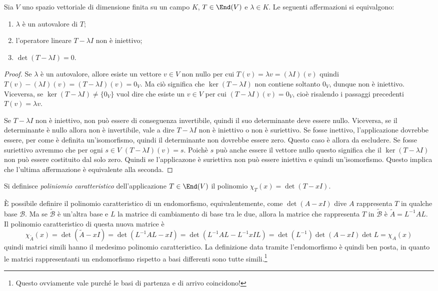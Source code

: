 \begin{teorema}\label{t:autovalore-determinante}
	Sia $V$ uno spazio vettoriale di dimensione finita su un campo $K$, $T\in\End(V)$ e $\lambda\in K$. Le seguenti affermazioni si equivalgono:
	\begin{enumerate}
		\item $\lambda$ è un autovalore di $T$;
		\item l'operatore lineare $T-\lambda I$ non è iniettivo;
		\item $\det(T-\lambda I)=0$.
	\end{enumerate}
\end{teorema}
\begin{proof}
	Se $\lambda$ è un autovalore, allore esiste un vettore $v\in V$ non nullo per cui $T(v)=\lambda v=(\lambda I)(v)$ quindi $T(v)-(\lambda I)(v)=(T-\lambda I)(v)=0_V$.
	Ma ciò significa che $\ker(T-\lambda I)$ non contiene soltanto $0_V$, dunque non è iniettivo.
	Viceversa, se $\ker(T-\lambda I)\neq\{0_V\}$ vuol dire che esiste un $v\in V$ per cui $(T-\lambda I)(v)=0_V$, cioè risalendo i passaggi precedenti $T(v)=\lambda v$.

	Se $T-\lambda I$ non è iniettivo, non può essere di conseguenza invertibile, quindi il suo determinante deve essere nullo.
	Viceversa, se il determinante è nullo allora non è invertibile, vale a dire $T-\lambda I$ non è iniettivo o non è suriettivo.
	Se fosse inettivo, l'applicazione dovrebbe essere, per come è definita un'isomorfismo, quindi il determinante non dovrebbe essere zero.
	Questo caso è allora da escludere.
	Se fosse suriettivo avremmo che per ogni $s\in V$ $(T-\lambda I)(v) =  s$.
	Poichè $s$ può anche essere il vettore nullo questo significa che il $\ker(T-\lambda I)$ non può essere costituito dal solo zero.
	Quindi se l'applicazone è suriettiva non può essere iniettiva e quindi un'isomorfismo.
	Questo implica che l'ultima affermazione è equivalente alla seconda.
\end{proof}
\begin{definizione} \label{d:polinomio-caratteristico}
	Si definisce \emph{poliniomio caratteristico} dell'applicazione $T\in\End(V)$ il polinomio $\chi_T(x)=\det(T-xI)$.
\end{definizione}
È possibile definire il polinomio caratteristico di un endomorfismo, equivalentemente, come $\det(A-xI)$ dive $A$ rappresenta $T$ in qualche base $\mathcal B$.
Ma se $\tilde{\mathcal B}$ è un'altra base e $L$ la matrice di cambiamento di base tra le due, allora la matrice che rappresenta $T$ in $\tilde{\mathcal B}$ è $\tilde{A}=L^{-1}AL$.
Il polinomio caratteristico di questa nuova matrice è
\begin{equation*}
	\chi_{\tilde{A}}(x)=\det(\tilde{A}-xI)=\det(L^{-1}AL-xI)=\det(L^{-1}AL-L^{-1}xIL)=\det(L^{-1})\det(A-xI)\det L=\chi_A(x)
\end{equation*}
quindi matrici simili hanno il medesimo polinomio caratteristico.
La definizione data tramite l'endomorfismo è quindi ben posta, in quanto le matrici rappresentanti un endomorfismo rispetto a basi differenti sono tutte simili.\footnote{Questo ovviamente vale purch\'e le basi di partenza e di arrivo coincidono!}

